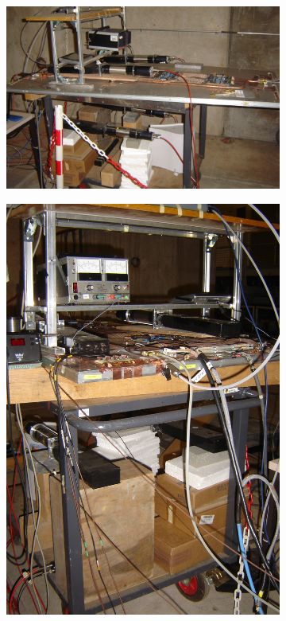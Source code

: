	\begin{figure}[H]
		\begin{subfigure}{\linewidth}
		    \centering
			\includegraphics[width = 0.7\linewidth]{fig/chapt6/Setup-GIF-side.JPG}
			\caption{\label{fig:Setup-GIF:A}}
		\end{subfigure}
		\begin{subfigure}{0.5\linewidth}
		    \centering
			\includegraphics[width = 0.8\linewidth]{fig/chapt6/Setup-GIF-front.JPG}
			\caption{\label{fig:Setup-GIF:B}}
		\end{subfigure}

\end{figure}
